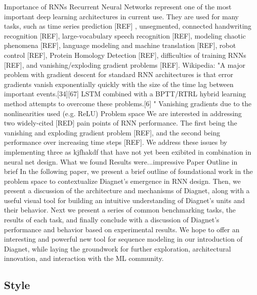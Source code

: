 \documentclass{article}
\begin{document}
%
Importance of RNNs
Recurrent Neural Networks represent one of the most important deep learning architectures in current use.  They are used for many tasks, such as time series prediction [REF] , unsegmented, connected handwriting recognition [REF], large-vocabulary speech recognition [REF], modeling chaotic phenomena [REF], language modeling and machine translation [REF], robot control [REF], Protein Homology Detection [REF], difficulties of training RNNs [REF], and vanishing/exploding gradient problems [REF]. 
Wikipedia: "A major problem with gradient descent for standard RNN architectures is that error gradients vanish exponentially quickly with the size of the time lag between important events.[34][67] LSTM combined with a BPTT/RTRL hybrid learning method attempts to overcome these problems.[6] "
Vanishing gradients due to the nonlinearities used (e.g. ReLU)
      Problem space We are interested in addressing two widely-cited [RED] pain points of RNN performance.  The first being the vanishing and exploding gradient problem [REF], and the second being performance over increasing time steps [REF].  We address these issues by implementing three as kjfhakdf that have not yet been exibited in combination in neural net design. 
What we found Results were...impressive
Paper Outline in brief In the following paper, we present a brief outline of foundational work in the problem space to contextualize Diagnet’s emergence in RNN design.  Then, we present a discussion of the architecture and mechanisms of Diagnet, along with a useful visual tool for building an intuitive understanding of Diagnet’s units and their behavior.  Next we present a series of common benchmarking tasks, the results of each task, and finally conclude with a discussion of Diagnet’s performance and behavior based on experimental results.  We hope to offer an interesting and powerful new tool for sequence modeling in our introduction of Diagnet, while laying the groundwork for further exploration, architectural innovation, and interaction with the ML community.

\subsection{Style}
\end{document}
